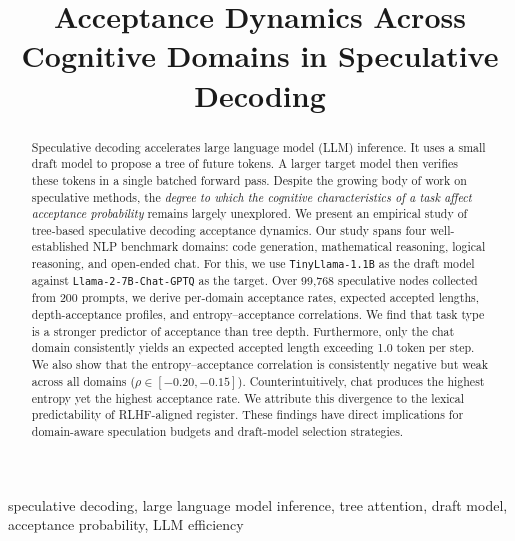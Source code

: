 \documentclass[conference]{IEEEtran}
\begin{document}
\title{Acceptance Dynamics Across Cognitive Domains in Speculative Decoding }

\author{
}

\maketitle

\begin{abstract}
Speculative decoding accelerates large language model (LLM) inference. It uses a small draft model to propose a tree of future tokens. A larger target model then verifies these tokens in a single batched forward pass. Despite the
growing body of work on speculative methods, the \emph{degree to which the
cognitive characteristics of a task affect acceptance probability} remains
largely unexplored. We present an empirical study of tree-based speculative decoding acceptance dynamics. Our study spans four well-established NLP benchmark domains: code generation, mathematical reasoning, logical reasoning, and open-ended chat. For this, we use \texttt{TinyLlama-1.1B} as the draft model against \texttt{Llama-2-7B-Chat-GPTQ} as the target. Over 99,768 speculative nodes
collected from 200 prompts, we derive per-domain acceptance rates, expected
accepted lengths, depth-acceptance profiles, and entropy--acceptance
correlations. We find that task type is a stronger predictor of acceptance than tree depth. Furthermore, only the chat domain consistently yields an expected accepted length exceeding 1.0 token per step. We also show that the entropy--acceptance correlation is consistently negative but weak across all domains ($\rho \in [-0.20, -0.15]$). Counterintuitively, chat produces the highest entropy yet the highest acceptance rate. We attribute this divergence to the lexical predictability of RLHF-aligned register. These findings have direct
implications for domain-aware speculation budgets and draft-model selection
strategies.
\end{abstract}

\begin{IEEEkeywords}
speculative decoding, large language model inference, tree attention,
draft model, acceptance probability, LLM efficiency
\end{IEEEkeywords}
\end{document}

